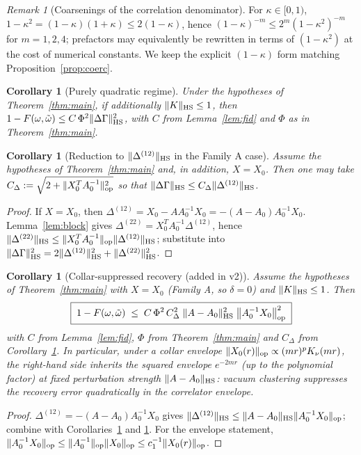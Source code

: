 \documentclass[11pt]{article}
\newtheorem{corollary}[theorem]{Corollary}
\theoremstyle{remark}
\newtheorem{remark}[theorem]{Remark}
\newcommand{\HS}{{\rm HS}}
\newcommand{\op}{{\rm op}}
\begin{document}
\begin{remark}[Coarsenings of the correlation denominator]
For $\kappa \in [0,1)$, $1 - \kappa^2 = (1-\kappa)(1+\kappa) \le
2(1-\kappa)$, hence $(1-\kappa)^{-m} \le 2^m (1-\kappa^2)^{-m}$ for
$m = 1, 2, 4$; prefactors may equivalently be rewritten in terms of
$(1-\kappa^2)$ at the cost of numerical constants. We keep the explicit
$(1-\kappa)$ form matching Proposition~\ref{prop:coerc}.
\end{remark}

\begin{corollary}[Purely quadratic regime]
\label{cor:quad}
Under the hypotheses of Theorem~\ref{thm:main}, if additionally
$\|K\|_\HS \le 1$, then
$1 - F(\omega,\tilde\omega) \le C\, \Phi^2 \|\Delta\Gamma\|_\HS^2$, with
$C$ from Lemma~\ref{lem:fid} and $\Phi$ as in Theorem~\ref{thm:main}.
\end{corollary}

\begin{corollary}[Reduction to $\|\Delta^{(12)}\|_\HS$ in the Family A case]
\label{cor:famA}
Assume the hypotheses of Theorem~\ref{thm:main} and, in addition,
$X = X_0$. Then one may take
$C_\Delta := \sqrt{2 + \|X_0^T A_0^{-1}\|_\op^2}$ so that
$\|\Delta\Gamma\|_\HS \le C_\Delta \|\Delta^{(12)}\|_\HS$.
\end{corollary}
\begin{proof}
If $X = X_0$, then $\Delta^{(12)} = X_0 - AA_0^{-1}X_0 =
-(A - A_0)A_0^{-1}X_0$. Lemma~\ref{lem:block} gives
$\Delta^{(22)} = X_0^T A_0^{-1}\Delta^{(12)}$, hence
$\|\Delta^{(22)}\|_\HS \le \|X_0^T A_0^{-1}\|_\op \|\Delta^{(12)}\|_\HS$;
substitute into
$\|\Delta\Gamma\|_\HS^2 = 2\|\Delta^{(12)}\|_\HS^2 + \|\Delta^{(22)}\|_\HS^2$.
\end{proof}

\begin{corollary}[Collar-suppressed recovery (added in v2)]
\label{cor:collar}
Assume the hypotheses of Theorem~\ref{thm:main} with $X = X_0$ (Family A,
so $\delta = 0$) and $\|K\|_\HS \le 1$. Then
\[
\boxed{\;
1 - F(\omega, \tilde\omega) \;\le\;
C\, \Phi^2\, C_\Delta^2\;
\|A - A_0\|_\HS^2\; \bigl\|A_0^{-1} X_0\bigr\|_\op^2
\;}
\]
with $C$ from Lemma~\ref{lem:fid}, $\Phi$ from Theorem~\ref{thm:main} and
$C_\Delta$ from Corollary~\ref{cor:famA}. In particular, under a collar
envelope $\|X_0(r)\|_\op \propto (mr)^p K_\nu(mr)$, the right-hand side
inherits the squared envelope $e^{-2mr}$ (up to the polynomial factor) at
fixed perturbation strength $\|A - A_0\|_\HS$: vacuum clustering suppresses
the recovery error quadratically in the correlator envelope.
\end{corollary}
\begin{proof}
$\Delta^{(12)} = -(A - A_0)A_0^{-1}X_0$ gives
$\|\Delta^{(12)}\|_\HS \le \|A - A_0\|_\HS \|A_0^{-1}X_0\|_\op$; combine
with Corollaries~\ref{cor:quad} and \ref{cor:famA}. For the envelope
statement, $\|A_0^{-1}X_0\|_\op \le \|A_0^{-1}\|_\op \|X_0\|_\op \le
c_1^{-1}\|X_0(r)\|_\op$.
\end{proof}
\end{document}
